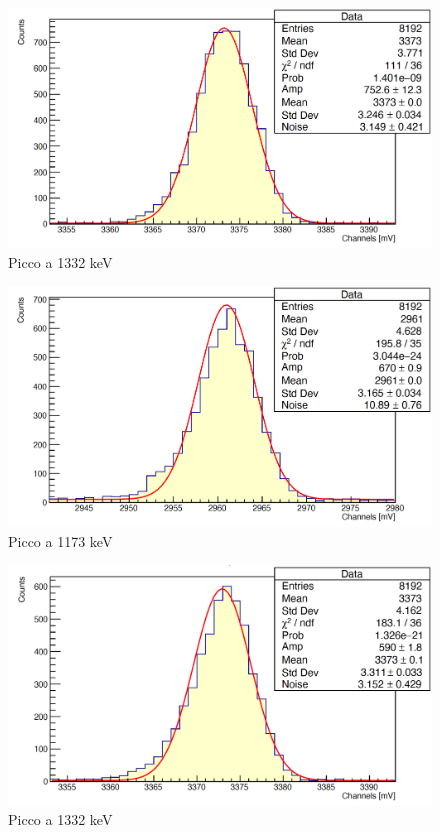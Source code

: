 \documentclass[a4paper,10pt]{article}
\begin{document}
\begin{figure}[H]
    \centering
    \includegraphics[scale=0.45]{appendice/spettri/CoA2_8}
    \caption{Picco a 1332 keV}
\end{figure}
\begin{figure}[H]
    \centering
    \includegraphics[scale=0.45]{appendice/spettri/CoA1_12}
    \caption{Picco a 1173 keV}
\end{figure}
\begin{figure}[H]
    \centering
    \includegraphics[scale=0.45]{appendice/spettri/CoA2_12}
    \caption{Picco a 1332 keV}
\end{figure}
\end{document}
